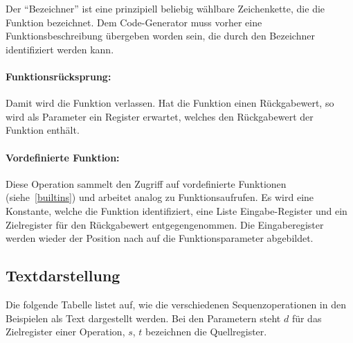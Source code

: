 \documentclass[twoside,a4paper,fleqn,12pt]{book}
\begin{document}
Der "`Bezeichner"' ist eine prinzipiell beliebig wählbare Zeichenkette, die die Funktion bezeichnet. Dem Code-Generator muss
vorher eine Funktionsbeschreibung übergeben worden sein, die durch den Bezeichner identifiziert werden kann.

\paragraph{Funktionsrücksprung:} Damit wird die Funktion verlassen. Hat die Funktion einen Rückgabewert, so wird als Parameter ein Register
erwartet, welches den Rückgabewert der Funktion enthält.

\paragraph{Vordefinierte Funktion:} Diese Operation sammelt den Zugriff auf vordefinierte Funktionen (siehe~\ref{builtins})
und arbeitet analog zu Funktionsaufrufen. Es wird eine Konstante, welche die Funktion identifiziert, eine Liste Eingabe-Register 
und ein Zielregister für den Rückgabewert entgegengenommen. Die Eingaberegister werden wieder der Position nach auf die Funktionsparameter abgebildet.


\subsection{Textdarstellung}

Die folgende Tabelle listet auf, wie die verschiedenen Sequenzoperationen in den Beispielen als Text dargestellt werden.
Bei den Parametern steht $d$ für das Zielregister einer Operation, $s$, $t$ bezeichnen die Quellregister.
\end{document}
